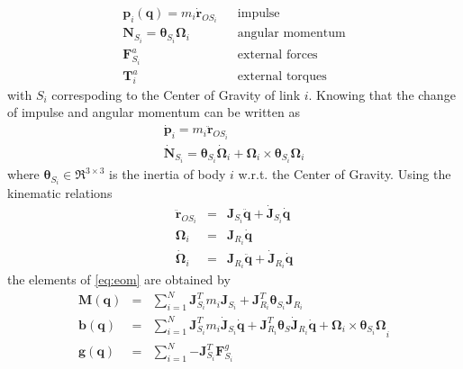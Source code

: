 \begin{eqnarray}
\mathbf{p}_i\left(\mathbf{q}\right) = m_i\dot{\mathbf{r}}_{OS_i} && \text{impulse} \\
\mathbf{N}_{S_i} = \boldsymbol{\theta}_{S_i}\mathbf{\Omega}_i && \text{angular momentum} \\
\mathbf{F}^a_{S_i} && \text{external forces} \\
\mathbf{T}^a_i && \text{external torques}
\end{eqnarray}
with $S_i$ correspoding to the Center of Gravity of link $i$.  Knowing that the change of impulse and angular momentum can be written as 
\begin{eqnarray}
\dot{\mathbf{p}}_i = m_i \ddot{\mathbf{r}}_{OS_i} \\
\dot{\mathbf{N}}_{S_i} = \boldsymbol{\theta}_{S_i} \dot{\boldsymbol{\Omega}}_i + \boldsymbol{\Omega}_i\times\boldsymbol{\theta}_{S_i}\boldsymbol{\Omega}_i
\end{eqnarray}
where $\boldsymbol{\theta}_{S_i}\in \Re^{3\times 3}$ is the inertia of body $i$ w.r.t. the Center of Gravity.  Using the kinematic relations
\begin{eqnarray}
\ddot{\mathbf{r}}_{OS_i} &=& \mathbf{J}_{S_i}\ddot{\mathbf{q}}+\dot{\mathbf{J}}_{S_i}\dot{\mathbf{q}} \\
\boldsymbol{\Omega}_i &=& \mathbf{J}_{R_i} \dot{\mathbf{q}} \\
\dot{\boldsymbol{\Omega}}_i &=& \mathbf{J}_{R_i} \ddot{\mathbf{q}} + \dot{\mathbf{J}}_{R_i} \dot{\mathbf{q}}
\end{eqnarray}
the elements of \eqref{eq:eom} are obtained by
\begin{eqnarray}
\mathbf{M}\left(\mathbf{q}\right) &=& \sum_{i=1}^N{\mathbf{J}_{S_i}^T m_i\mathbf{J}_{S_i} + \mathbf{J}_{R_i}^T \boldsymbol{\theta}_{S_i} \mathbf{J}_{R_i}}\\
\mathbf{b}\left(\mathbf{q}\right) &=& \sum_{i=1}^N{\mathbf{J}_{S_i}^T m_i\dot{\mathbf{J}}_{S_i}\dot{\mathbf{q}}+
\mathbf{J}_{R_i}^T \boldsymbol{\theta}_S \dot{\mathbf{J}}_{R_i}\dot{\mathbf{q}} + \boldsymbol{\Omega}_i\times\boldsymbol{\theta}_{S_i}\boldsymbol{\Omega}}_i \\
\mathbf{g}\left(\mathbf{q}\right) &=& \sum_{i=1}^N{-\mathbf{J}_{S_i}^T\mathbf{F}_{S_i}^g}
\end{eqnarray} 
